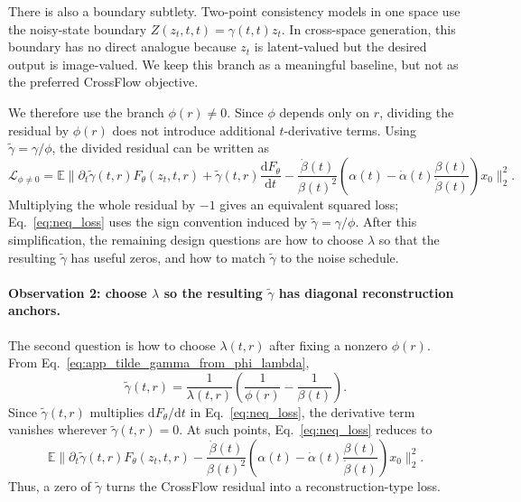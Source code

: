 There is also a boundary subtlety. Two-point consistency models in one space use the noisy-state boundary $Z(z_t,t,t)=\gamma(t,t)z_t$. In cross-space generation, this boundary has no direct analogue because $z_t$ is latent-valued but the desired output is image-valued. We keep this branch as a meaningful baseline, but not as the preferred CrossFlow objective.

We therefore use the branch $\phi(r)\neq0$. Since $\phi$ depends only on $r$, dividing the residual by $\phi(r)$ does not introduce additional $t$-derivative terms. Using $\tilde{\gamma}=\gamma/\phi$, the divided residual can be written as
\begin{equation}
\mathcal L_{\phi\neq0}
=
\mathbb E
\Bigg\|
\partial_t\tilde{\gamma}(t,r)F_\theta(z_t,t,r)
+
\tilde{\gamma}(t,r)\frac{\mathrm dF_\theta}{\mathrm dt}
-
\frac{\dot\beta(t)}{\beta(t)^2}
\left(
\alpha(t)-\dot\alpha(t)\frac{\beta(t)}{\dot\beta(t)}
\right)x_0
\Bigg\|_2^2 .
\label{eq:neq_loss}
\end{equation}
Multiplying the whole residual by $-1$ gives an equivalent squared loss; Eq.~\eqref{eq:neq_loss} uses the sign convention induced by $\tilde{\gamma}=\gamma/\phi$. After this simplification, the remaining design questions are how to choose $\lambda$ so that the resulting $\tilde{\gamma}$ has useful zeros, and how to match $\tilde{\gamma}$ to the noise schedule.

\paragraph{Observation 2: choose $\lambda$ so the resulting $\tilde{\gamma}$ has diagonal reconstruction anchors.}
The second question is how to choose $\lambda(t,r)$ after fixing a nonzero $\phi(r)$. From Eq.~\eqref{eq:app_tilde_gamma_from_phi_lambda},
\begin{equation}
\tilde{\gamma}(t,r)
=
\frac{1}{\lambda(t,r)}
\left(
\frac{1}{\phi(r)}
-
\frac{1}{\beta(t)}
\right).
\label{eq:app_tilde_gamma_after_lambda}
\end{equation}
Since $\tilde{\gamma}(t,r)$ multiplies $\mathrm dF_\theta/\mathrm dt$ in Eq.~\eqref{eq:neq_loss}, the derivative term vanishes wherever $\tilde{\gamma}(t,r)=0$. At such points, Eq.~\eqref{eq:neq_loss} reduces to
\begin{equation}
\mathbb E
\Bigg\|
\partial_t\tilde{\gamma}(t,r)F_\theta(z_t,t,r)
-
\frac{\dot\beta(t)}{\beta(t)^2}
\left(
\alpha(t)-\dot\alpha(t)\frac{\beta(t)}{\dot\beta(t)}
\right)x_0
\Bigg\|_2^2 .
\label{eq:recon_loss}
\end{equation}
Thus, a zero of $\tilde{\gamma}$ turns the CrossFlow residual into a reconstruction-type loss.

